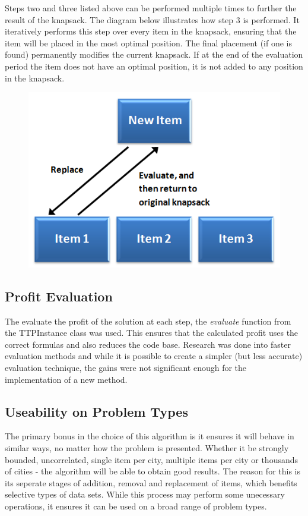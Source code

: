 \documentclass[a4paper,12pt]{article}
\begin{document}
\newpage

Steps two and three listed above can be performed multiple times to further the result of the knapsack. The diagram below illustrates how step 3 is performed. It iteratively performs this step over every item in the knapsack, ensuring that the item will be placed in the most optimal position. The final placement (if one is found) permanently modifies the current knapsack. If at the end of the evaluation period the item does not have an optimal position, it is not added to any position in the knapsack.
\begin{figure}[h]
\centering
\includegraphics{ObsessivePacking.png}
\end{figure}

\subsection{Profit Evaluation}
The evaluate the profit of the solution at each step, the \textit{evaluate} function from the TTPInstance class was used. This ensures that the calculated profit uses the correct formulas and also reduces the code base. Research was done into faster evaluation methods and while it is possible to create a simpler (but less accurate) evaluation technique, the gains were not significant enough for the implementation of a new method.

\subsection{Useability on Problem Types}
The primary bonus in the choice of this algorithm is it ensures it will behave in similar ways, no matter how the problem is presented. Whether it be strongly bounded, uncorrelated, single item per city, multiple items per city or thousands of cities - the algorithm will be able to obtain good results. The reason for this is its seperate stages of addition, removal and replacement of items, which benefits selective types of data sets. While this process may perform some unecessary operations, it ensures it can be used on a broad range of problem types.
\end{document}
